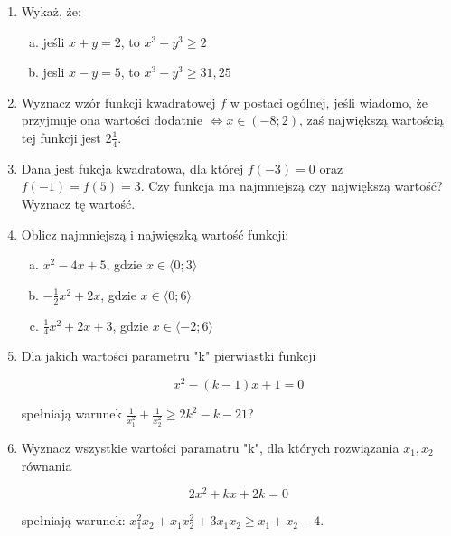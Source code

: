 \documentclass[12pt,a4paper]{article}
\begin{document}
	
	\begin{enumerate}[1.]
		\item Wykaż, że:
		
		\begin{enumerate}[a)]
			\item jeśli $x+y=2$, to $x^3+y^3\geq 2$
			\item jesli $x-y=5$, to $x^3-y^3\geq31,25$
		\end{enumerate}
	
	\item Wyznacz wzór funkcji kwadratowej $f$ w postaci ogólnej, jeśli wiadomo, że przyjmuje ona wartości dodatnie $\Leftrightarrow x\in (-8;2)$, zaś największą wartością tej funkcji jest $2\frac{1}{4}$.
	
	\item Dana jest fukcja kwadratowa, dla której $f(-3)=0$ oraz $f(-1)=f(5)=3$. Czy funkcja ma najmniejszą czy największą wartość? Wyznacz tę wartość.
	
	\item Oblicz najmniejszą i najwięszką wartość funkcji:
	\begin{enumerate}[a)]
		\item $x^2-4x+5$, gdzie $x\in\langle0;3\rangle$
		\item $-\frac{1}{2}x^2+2x$, gdzie $x\in\langle0;6\rangle$
		\item $\frac{1}{4}x^2+2x+3$, gdzie $x\in\langle-2;6\rangle$
	\end{enumerate} 

	\item Dla jakich wartości parametru "k" pierwiastki funkcji
	
	$$x^2-(k-1)x + 1 = 0$$ 
	
	spełniają warunek $\frac{1}{x_1^2}+\frac{1}{x_2^2}\geq 2k^2-k-21$?
	
	\item Wyznacz wszystkie wartości paramatru "k", dla których rozwiązania $x_1,x_2$ równania
	
	$$2x^2+kx+2k=0$$
	
	spełniają warunek: $x_1^2 x_2+x_1 x_2^2 + 3x_1x_2\geq x_1+x_2-4$.
		
	\end{enumerate}
\end{document}
